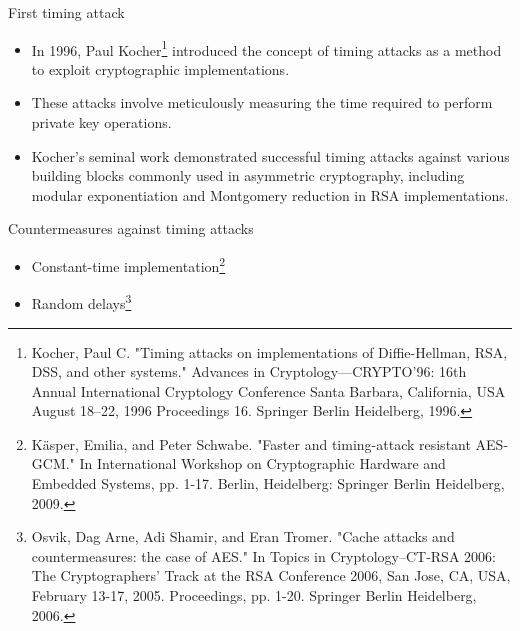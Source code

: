 \begin{frame}{First timing attack}
    \begin{itemize}
        \item In 1996, Paul Kocher\footnote{Kocher, Paul C. "Timing attacks on implementations of Diffie-Hellman, RSA, DSS, and other systems." Advances in Cryptology—CRYPTO’96: 16th Annual International Cryptology Conference Santa Barbara, California, USA August 18–22, 1996 Proceedings 16. Springer Berlin Heidelberg, 1996.} introduced the concept of timing attacks as a method to exploit cryptographic implementations.
        \item These attacks involve meticulously measuring the time required to perform private key operations.
        \item Kocher’s seminal work demonstrated successful timing attacks against various building blocks commonly used in asymmetric cryptography, including modular exponentiation and Montgomery reduction in RSA implementations.
    \end{itemize}
\end{frame}

\begin{frame}{Countermeasures against timing attacks}
    \begin{itemize}
        \item Constant-time implementation\footnote{Käsper, Emilia, and Peter Schwabe. "Faster and timing-attack resistant AES-GCM." In International Workshop on Cryptographic Hardware and Embedded Systems, pp. 1-17. Berlin, Heidelberg: Springer Berlin Heidelberg, 2009.}
        \item Random delays\footnote{Osvik, Dag Arne, Adi Shamir, and Eran Tromer. "Cache attacks and countermeasures: the case of AES." In Topics in Cryptology–CT-RSA 2006: The Cryptographers’ Track at the RSA Conference 2006, San Jose, CA, USA, February 13-17, 2005. Proceedings, pp. 1-20. Springer Berlin Heidelberg, 2006.}
    \end{itemize}
\end{frame}

